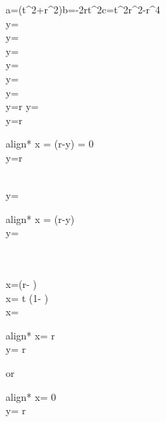\documentclass{article}
\begin{document}
	 \begin{flalign*}
	\Rightarrow a=(t^{2}+r^{2})\quad b=-2rt^{2}\quad c=t^{2}r^{2}-r^{4}\\
	y=\\
	\Rightarrow y=\\
	\Rightarrow y=\\
	\Rightarrow y=\\
	\Rightarrow y=\\
	\Rightarrow y=\\
		y=r  y=\\
\quad y=r\quad\Rightarrow
\begin{minipage}{0.45\textwidth}
	\begin{empheq}[left=\empheqlbrace]{align*}
		x = (r-y) = 0\\
		y=r
	\end{empheq}
\end{minipage}\\
\quad  y= \quad\Rightarrow
\begin{minipage}{0.45\textwidth}
	\begin{empheq}[left=\empheqlbrace]{align*}
		x = (r-y) \\
		y= 
	\end{empheq}
\end{minipage}\\
\\
\Rightarrow x=\left (r-   \right) \\
\Rightarrow x= t \left(1- \right)\\
\Rightarrow x= \\
\Rightarrow
\begin{minipage}{0.45\textwidth}
	\begin{empheq}[left=\empheqlbrace]{align*}
		x= r \\
		y= r
	\end{empheq}
\end{minipage}
{ or }
\begin{minipage}{0.45\textwidth}
	\begin{empheq}[left=\empheqlbrace]{align*}
		x= 0 \\
		y= r
	\end{empheq}
\end{minipage}
\end{flalign*}
\end{document}
